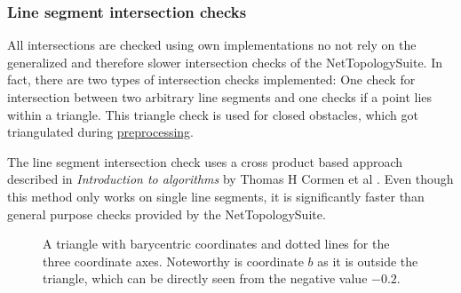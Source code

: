 			\subsubsection{Line segment intersection checks}
			\label{subsubsec:intersection-checks}
			
				All intersections are checked using own implementations no not rely on the generalized and therefore slower intersection checks of the NetTopologySuite.
				In fact, there are two types of intersection checks implemented:
				One check for intersection between two arbitrary line segments and one checks if a point lies within a triangle.
				This triangle check is used for closed obstacles, which got triangulated during \hyperref[subsec:step-1-preprocessing]{preprocessing}.
				
				The line segment intersection check uses a cross product based approach described in \emph{Introduction to algorithms} by Thomas H Cormen et al \cite[1018]{cormen-introduction-to-alg}.
				Even though this method only works on single line segments, it is significantly faster than general purpose checks provided by the NetTopologySuite.
				
				\begin{figure}[h]
					\begin{figcenter}
					\end{figcenter}
					\caption{A triangle with barycentric coordinates and dotted lines for the three coordinate axes. Noteworthy is coordinate $b$ as it is outside the triangle, which can be directly seen from the negative value $-0.2$.}
					\label{fig:barycentric-triangle}
				\end{figure}
				
